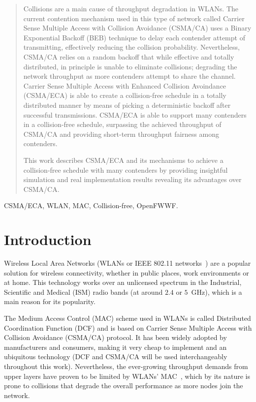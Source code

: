 \documentclass[a4paper,journal]{IEEEtran}
\begin{document}
\begin{abstract}

\boldmath Collisions are a main cause of throughput degradation in WLANs. The current contention mechanism used in this type of network called Carrier Sense Multiple Access with Collision Avoidance (CSMA/CA) uses a Binary Exponential Backoff (BEB) technique to delay each contender attempt of transmitting, effectively reducing the collision probability. Nevertheless, CSMA/CA relies on a random backoff that while effective and totally distributed, in principle is unable to eliminate collisions; degrading the network throughput as more contenders attempt to share the channel. Carrier Sense Multiple Access with Enhanced Collision Avoindance (CSMA/ECA) is able to create a collision-free schedule in a totally distributed manner by means of picking a deterministic backoff after successful transmissions. CSMA/ECA is able to support many contenders in a collision-free schedule, surpassing the achieved throughput of CSMA/CA and providing short-term throughput fairness among contenders.

This work describes CSMA/ECA and its mechanisms to achieve a collision-free schedule with many contenders by providing insightful simulation and real implementation results revealing its advantages over CSMA/CA. 

\end{abstract}

\begin{IEEEkeywords}
CSMA/ECA, WLAN, MAC, Collision-free, OpenFWWF.
\end{IEEEkeywords}

\section{Introduction}\label{introduction}
Wireless Local Area Networks (WLANs or IEEE 802.11 networks~\cite{802Standards}) are a popular solution for wireless connectivity, whether in public places, work environments or at home. This technology works over an unlicensed spectrum in the Industrial, Scientific and Medical (ISM) radio bands (at around $2.4$ or $5$~GHz), which is a main reason for its popularity. 

The Medium Access Control (MAC) scheme used in WLANs is called Distributed Coordination Function (DCF) and is based on Carrier Sense Multiple Access with Collision Avoidance (CSMA/CA) protocol. It has been widely adopted by manufacturers and consumers, making it very cheap to implement and an ubiquitous technology (DCF and CSMA/CA will be used interchangeably throughout this work). Nevertheless, the ever-growing throughput demands from upper layers have proven to be limited by WLANs' MAC~\cite{perahia2008ieee}, which by its nature is prone to collisions that degrade the overall performance as more nodes join the network.
\end{document}
